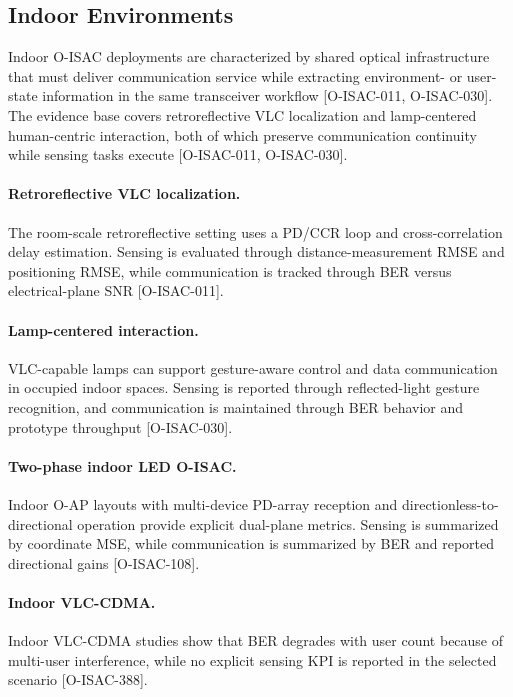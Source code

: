 \subsection{Indoor Environments}
\label{subsec:apps-indoor}

Indoor O-ISAC deployments are characterized by shared optical infrastructure that must deliver communication service while extracting environment- or user-state information in the same transceiver workflow [O-ISAC-011, O-ISAC-030]. The evidence base covers retroreflective VLC localization and lamp-centered human-centric interaction, both of which preserve communication continuity while sensing tasks execute [O-ISAC-011, O-ISAC-030].

\paragraph{Retroreflective VLC localization.}
The room-scale retroreflective setting uses a PD/CCR loop and cross-correlation delay estimation. Sensing is evaluated through distance-measurement RMSE and positioning RMSE, while communication is tracked through BER versus electrical-plane SNR [O-ISAC-011].

\paragraph{Lamp-centered interaction.}
VLC-capable lamps can support gesture-aware control and data communication in occupied indoor spaces. Sensing is reported through reflected-light gesture recognition, and communication is maintained through BER behavior and prototype throughput [O-ISAC-030].

\paragraph{Two-phase indoor LED O-ISAC.}
Indoor O-AP layouts with multi-device PD-array reception and directionless-to-directional operation provide explicit dual-plane metrics. Sensing is summarized by coordinate MSE, while communication is summarized by BER and reported directional gains [O-ISAC-108].

\paragraph{Indoor VLC-CDMA.}
Indoor VLC-CDMA studies show that BER degrades with user count because of multi-user interference, while no explicit sensing KPI is reported in the selected scenario [O-ISAC-388].

